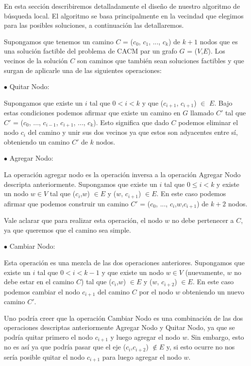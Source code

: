 En esta sección describiremos detalladamente el diseño de nuestro algoritmo de búsqueda local. El algoritmo se basa principalmente en la vecindad que elegimos para las posibles soluciones, a continuación las detallaremos.

Supongamos que tenemos un camino $C$ = ($c_0$, $c_1$, ..., $c_k$) de $k+1$ nodos que es una solución factible del problema de CACM par un grafo $G$ = ($V$,$E$). Los vecinos de la solución $C$ son caminos que también sean soluciones factibles y que surgan de aplicarle una de las siguientes operaciones:

$\bullet$ Quitar Nodo:

Supongamos que existe un $i$ tal que $0 < i < k$ y que ($c_{i+1}$, $c_{i+1}$) $\in$ $E$. Bajo estas condiciones podemos afirmar que existe un camino en $G$ llamado $C'$ tal que $C'$ = ($c_0$, ..., $c_{i-1}$, $c_{i+1}$, ..., $c_k$). Esto significa que dado $C$ podemos eliminar el nodo $c_i$ del camino y unir sus dos vecinos ya que estos son adyacentes entre sí, obteniendo un camino $C'$ de $k$ nodos.

$\bullet$ Agregar Nodo:

La operación agregar nodo es la operación inversa a la operación Agregar Nodo descripta anteriormente. Supongamos que existe un $i$ tal que $0 \leq i < k$ y existe un nodo $w \in V$ tal que ($c_i$,$w$) $\in E$ y ($w$, $c_{i+1}$) $\in E$. En este caso podemos afirmar que podemos construir un camino $C'$ = ($c_0$, ..., $c_{i}$,$w$,$c_{i+1}$) de $k+2$ nodos.

Vale aclarar que para realizar esta operación, el nodo $w$ no debe pertenecer a $C$, ya que queremos que el camino sea simple.

$\bullet$ Cambiar Nodo:

Esta operación es una mezcla de las dos operaciones anteriores. Supongamos que existe un $i$ tal que $0 < i < k-1$ y que existe un nodo $w \in V$ (nuevamente, $w$ no debe estar en el camino $C$) tal que ($c_i$,$w$) $\in E$ y ($w$, $c_{i+2}$) $\in E$. En este caso podemos cambiar el nodo $c_{i+1}$ del camino $C$ por el nodo $w$ obteniendo un nuevo camino $C'$.

Uno podría creer que la operación Cambiar Nodo es una combinación de las dos operaciones descriptas anteriormente Agregar Nodo y Quitar Nodo, ya que se podría quitar primero el nodo $c_{i+1}$ y luego agregar el nodo $w$. Sin embargo, esto no es así ya que podría pasar que el eje ($c_i$,$c_{i+2}$) $\notin E$ y, si esto ocurre no nos sería posible quitar el nodo $c_{i+1}$ para luego agregar el nodo $w$.


